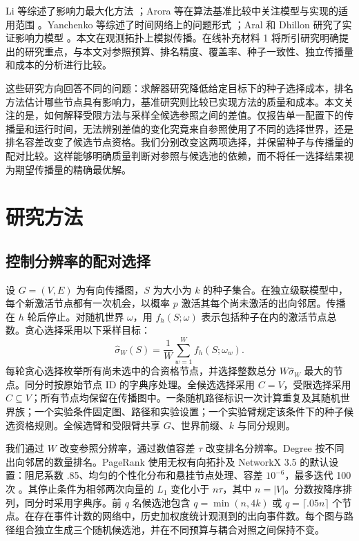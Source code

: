 \documentclass[smallextended]{svjour3}
\begin{document}
Li 等综述了影响力最大化方法 \cite{ref9}；Arora 等在算法基准比较中关注模型与实现的适用范围 \cite{ref16}。Yanchenko 等综述了时间网络上的问题形式 \cite{ref11}；Aral 和 Dhillon 研究了实证影响力模型 \cite{ref15}。本文在观测拓扑上模拟传播。在线补充材料 1 将所引研究明确提出的研究重点，与本文对参照预算、排名精度、覆盖率、种子一致性、独立传播量和成本的分析进行比较。

这些研究方向回答不同的问题：求解器研究降低给定目标下的种子选择成本，排名方法估计哪些节点具有影响力，基准研究则比较已实现方法的质量和成本。本文关注的是，如何解释受限方法与采样全候选参照之间的差值。仅报告单一配置下的传播量和运行时间，无法辨别差值的变化究竟来自参照使用了不同的选择世界，还是排名容差改变了候选节点资格。我们分别改变这两项选择，并保留种子与传播量的配对比较。这样能够明确质量判断对参照与候选池的依赖，而不将任一选择结果视为期望传播量的精确最优解。

\section{研究方法}
\subsection{控制分辨率的配对选择}
设 $G=(V,E)$ 为有向传播图，$S$ 为大小为 $k$ 的种子集合。在独立级联模型中，每个新激活节点都有一次机会，以概率 $p$ 激活其每个尚未激活的出向邻居。传播在 $h$ 轮后停止。对随机世界 $\omega$，用 $f_h(S;\omega)$ 表示包括种子在内的激活节点总数。贪心选择采用以下采样目标：
\begin{equation}
\widehat\sigma_W(S)=\frac{1}{W}\sum_{w=1}^{W}f_h(S;\omega_w).
\end{equation}
每轮贪心选择枚举所有尚未选中的合资格节点，并选择整数总分 $W\widehat\sigma_W$ 最大的节点。同分时按原始节点 ID 的字典序处理。全候选选择采用 $C=V$，受限选择采用 $C\subseteq V$；所有节点均保留在传播图中。一条随机路径标识一次计算重复及其随机世界族；一个实验条件固定图、路径和实验设置；一个实验臂规定该条件下的种子候选资格规则。全候选臂和受限臂共享 $G$、世界前缀、$k$ 与同分规则。

我们通过 $W$ 改变参照分辨率，通过数值容差 $\tau$ 改变排名分辨率。Degree 按不同出向邻居的数量排名。PageRank 使用无权有向拓扑及 NetworkX 3.5 的默认设置：阻尼系数 .85、均匀的个性化分布和悬挂节点处理、容差 $10^{-6}$，最多迭代 100 次 \cite{networkxpr}。其停止条件为相邻两次向量的 $L_1$ 变化小于 $n\tau$，其中 $n=|V|$。分数按降序排列，同分时采用字典序。前 $q$ 名候选池包含 $q=\min(n,4k)$ 或 $q=\lceil .05n\rceil$ 个节点。在存在事件计数的网络中，历史加权度统计观测到的出向事件数。每个图与路径组合独立生成三个随机候选池，并在不同预算与耦合对照之间保持不变。
\end{document}
